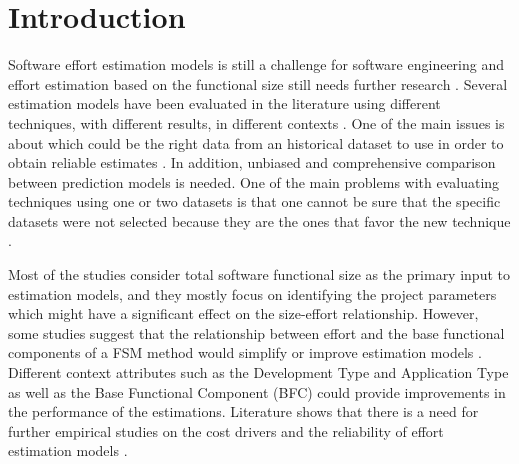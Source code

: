 \documentclass[conference]{IEEEtran}
\begin{document}

\section{Introduction} \label{sec:Introduction}

Software effort estimation models is still a challenge for software engineering \cite{dejaeger:2012} and effort estimation based on the functional size still needs further research \cite{Gencel:2008}. Several estimation models have been evaluated in the literature using different techniques, with different results, in different contexts \cite{dejaeger:2012}. One of the main issues is about which could be the right data from an historical dataset to use in order to obtain reliable estimates \cite{GencelBuglione:2008}. In addition, unbiased and comprehensive comparison between prediction models is needed. One of the main problems with evaluating techniques using one or two datasets is that one cannot be sure that the specific datasets were not selected because they are the ones that favor the new technique \cite{Kitchenham:2009}.

Most of the studies consider total software functional size as the primary input to estimation models, and they mostly focus on identifying the project parameters which might have a significant effect on the size-effort relationship. However, some studies suggest that the relationship between effort and the base functional components of a FSM method would simplify or improve estimation models \cite{Gencel:2008} \cite{GencelBuglione:2008} \cite{GencelBuglione:2008a} \cite{Lavazza:2013} \cite{QuesadaLopez:2016} \cite{MurilloMorera:2016} \cite{QuesadaLopez:2015} \cite{QuesadaLopez:2014}. Different context attributes such as the Development Type and Application Type as well as the Base Functional Component (BFC) could provide improvements in the performance of the estimations. Literature shows that there is a need for further empirical studies on the cost drivers and the reliability of effort estimation models \cite{GencelBuglione:2008a}.
\end{document}
